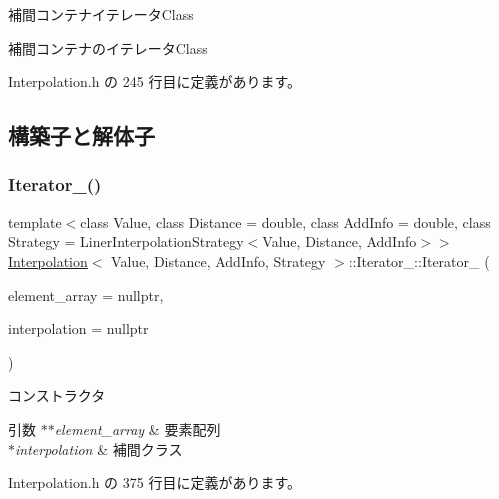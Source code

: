 補間コンテナイテレータ\+Class 

補間コンテナのイテレータ\+Class 

 Interpolation.\+h の 245 行目に定義があります。



\subsection{構築子と解体子}
\mbox{\label{class_interpolation_1_1_iterator___a6d4d602b7d46bd9882944de310dc9696}} 
\subsubsection{\texorpdfstring{Iterator\+\_\+()}{Iterator\_()}}
{\footnotesize\ttfamily template$<$class Value, class Distance = double, class Add\+Info = double, class Strategy = Liner\+Interpolation\+Strategy$<$\+Value, Distance, Add\+Info$>$$>$ \\
\mbox{\hyperlink{class_interpolation}{Interpolation}}$<$ Value, Distance, Add\+Info, Strategy $>$\+::Iterator\+\_\+\+::\+Iterator\+\_\+ (\begin{DoxyParamCaption}\item[{\mbox{\hyperlink{class_interpolation_a01e71544809483d7a2ee72fe0007bcb0}{Element}} $\ast$$\ast$}]{element\+\_\+array = {\ttfamily nullptr},  }\item[{\mbox{\hyperlink{class_interpolation}{Interpolation}} $\ast$}]{interpolation = {\ttfamily nullptr} }\end{DoxyParamCaption})\hspace{0.3cm}{\ttfamily [inline]}}



コンストラクタ 


\begin{DoxyParams}{引数}
{\em $\ast$$\ast$element\+\_\+array} & 要素配列 \\
\hline
{\em $\ast$interpolation} & 補間クラス \\
\hline
\end{DoxyParams}


 Interpolation.\+h の 375 行目に定義があります。



